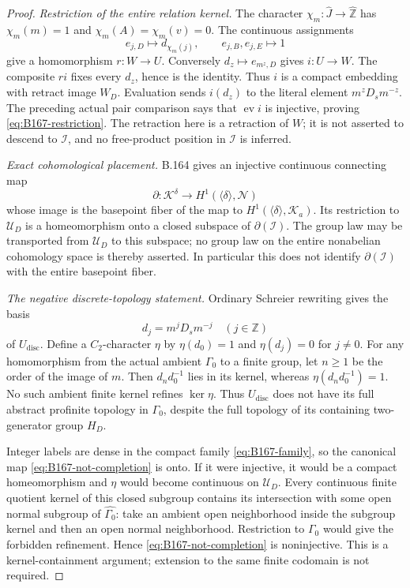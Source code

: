 \begin{proof}
\emph{Restriction of the entire relation kernel.}
The character
\(\chi_m:\widehat J\to\widehat{\mathbb Z}\) has
\(\chi_m(m)=1\) and \(\chi_m(A)=\chi_m(v)=0\).
The continuous assignments
\[
 e_{j,D}\longmapsto d_{\chi_m(j)},\qquad
 e_{j,B},e_{j,E}\longmapsto1
\]
give a homomorphism \(r:W\to U\).
Conversely \(d_z\mapsto e_{m^z,D}\) gives \(i:U\to W\).
The composite \(ri\) fixes every \(d_z\), hence is the identity.
Thus \(i\) is a compact embedding with retract image \(W_D\).
Evaluation sends \(i(d_z)\) to the literal element
\(m^zD_sm^{-z}\). The preceding actual pair comparison says that
\(\operatorname{ev}i\) is injective, proving
\eqref{eq:B167-restriction}.
The retraction here is a retraction of \(W\); it is not asserted
to descend to \(\mathcal I\), and no free-product position in
\(\mathcal I\) is inferred.

\emph{Exact cohomological placement.}
B.164 gives an injective continuous connecting map
\[
 \partial:\mathcal K^\delta\longrightarrow
 H^1(\langle\delta\rangle,\mathcal N)
\]
whose image is the basepoint fiber of the map to
\(H^1(\langle\delta\rangle,\mathcal K_a)\).
Its restriction to \(\mathcal U_D\) is a homeomorphism onto a
closed subspace of \(\partial(\mathcal I)\).
The group law may be transported from \(\mathcal U_D\) to this
subspace; no group law on the entire nonabelian cohomology space
is thereby asserted. In particular this does not identify
\(\partial(\mathcal I)\) with the entire basepoint fiber.

\emph{The negative discrete-topology statement.}
Ordinary Schreier rewriting gives the basis
\[
 d_j=m^jD_sm^{-j}\quad(j\in\mathbb Z)
\]
of \(U_{\mathrm{disc}}\). Define a \(C_2\)-character \(\eta\) by
\(\eta(d_0)=1\) and \(\eta(d_j)=0\) for \(j\ne0\).
For any homomorphism from the actual ambient \(\Gamma_0\) to a
finite group, let \(n\ge1\) be the order of the image of \(m\).
Then \(d_nd_0^{-1}\) lies in its kernel, whereas
\(\eta(d_nd_0^{-1})=1\).
No such ambient finite kernel refines \(\ker\eta\).
Thus \(U_{\mathrm{disc}}\) does not have its full abstract
profinite topology in \(\Gamma_0\), despite the full topology
of its containing two-generator group \(H_D\).

Integer labels are dense in the compact family
\eqref{eq:B167-family}, so the canonical map
\eqref{eq:B167-not-completion} is onto.
If it were injective, it would be a compact homeomorphism and
\(\eta\) would become continuous on \(\mathcal U_D\).
Every continuous finite quotient kernel of this closed subgroup
contains its intersection with some open normal subgroup of
\(\widehat{\Gamma_0}\): take an ambient open neighborhood inside
the subgroup kernel and then an open normal neighborhood.
Restriction to \(\Gamma_0\) would give the forbidden refinement.
Hence \eqref{eq:B167-not-completion} is noninjective.
This is a kernel-containment argument; extension to the same
finite codomain is not required.
\end{proof}

